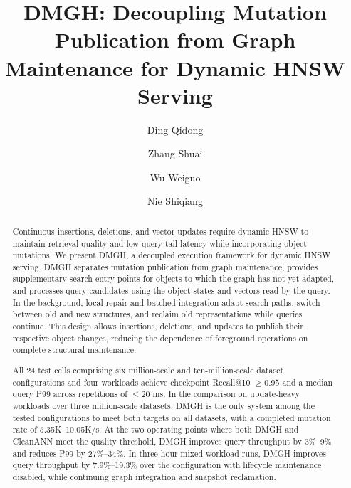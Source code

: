 \documentclass[sigconf,pbalance]{acmart}
\begin{document}
\title[DMGH: Decoupling Mutation Publication from Graph Maintenance]{DMGH: Decoupling Mutation Publication from Graph Maintenance for Dynamic HNSW Serving}

\author{Ding Qidong}

\author{Zhang Shuai}

\author{Wu Weiguo}

\author{Nie Shiqiang}

\renewcommand{\shortauthors}{Ding Qidong et al.}

\begin{abstract}
Continuous insertions, deletions, and vector updates require dynamic HNSW to maintain retrieval quality and low query tail latency while incorporating object mutations. We present DMGH, a decoupled execution framework for dynamic HNSW serving. DMGH separates mutation publication from graph maintenance, provides supplementary search entry points for objects to which the graph has not yet adapted, and processes query candidates using the object states and vectors read by the query. In the background, local repair and batched integration adapt search paths, switch between old and new structures, and reclaim old representations while queries continue. This design allows insertions, deletions, and updates to publish their respective object changes, reducing the dependence of foreground operations on complete structural maintenance.

All 24 test cells comprising six million-scale and ten-million-scale dataset configurations and four workloads achieve checkpoint Recall@10 $\geq0.95$ and a median query P99 across repetitions of $\leq20$ ms. In the comparison on update-heavy workloads over three million-scale datasets, DMGH is the only system among the tested configurations to meet both targets on all datasets, with a completed mutation rate of 5.35K--10.05K/s. At the two operating points where both DMGH and CleanANN meet the quality threshold, DMGH improves query throughput by 3\%--9\% and reduces P99 by 27\%--34\%. In three-hour mixed-workload runs, DMGH improves query throughput by 7.9\%--19.3\% over the configuration with lifecycle maintenance disabled, while continuing graph integration and snapshot reclamation.

\end{abstract}
\end{document}

